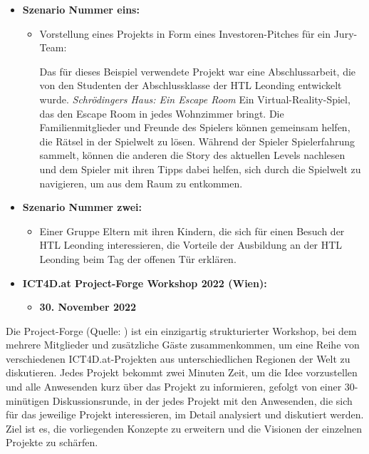 \begin{itemize}
    \item \textbf{Szenario Nummer eins: }
          \begin{itemize}
              \item {Vorstellung eines Projekts in Form eines Investoren-Pitches für ein Jury-Team:

                    Das für dieses Beispiel verwendete Projekt war eine Abschlussarbeit, die von den Studenten der Abschlussklasse der HTL Leonding entwickelt wurde. \textit{Schrödingers Haus: Ein Escape Room} Ein Virtual-Reality-Spiel, das den Escape Room in jedes Wohnzimmer bringt. Die Familienmitglieder und Freunde des Spielers können gemeinsam helfen, die Rätsel in der Spielwelt zu lösen. Während der Spieler Spielerfahrung sammelt, können die anderen die Story des aktuellen Levels nachlesen und dem Spieler mit ihren Tipps dabei helfen, sich durch die Spielwelt zu navigieren, um aus dem Raum zu entkommen.}
          \end{itemize}
    \item \textbf{Szenario Nummer zwei: }
          \begin{itemize}
              \item {Einer Gruppe Eltern mit ihren Kindern, die sich für einen Besuch der HTL Leonding interessieren, die Vorteile der Ausbildung an der HTL Leonding beim Tag der offenen Tür erklären.}
          \end{itemize}
\end{itemize}

\begin{itemize}
    \item \textbf{ICT4D.at Project-Forge Workshop 2022 (Wien):}
          \begin{itemize}
              \item \textbf{30. November 2022}
          \end{itemize}
\end{itemize}


Die Project-Forge (Quelle: ) ist ein einzigartig strukturierter Workshop, bei dem mehrere Mitglieder und zusätzliche Gäste zusammenkommen, um eine Reihe von verschiedenen ICT4D.at-Projekten aus unterschiedlichen Regionen der Welt zu diskutieren. Jedes Projekt bekommt zwei Minuten Zeit, um die Idee vorzustellen und alle Anwesenden kurz über das Projekt zu informieren, gefolgt von einer 30-minütigen Diskussionsrunde, in der jedes Projekt mit den Anwesenden, die sich für das jeweilige Projekt interessieren, im Detail analysiert und diskutiert werden. Ziel ist es, die vorliegenden Konzepte zu erweitern und die Visionen der einzelnen Projekte zu schärfen.

